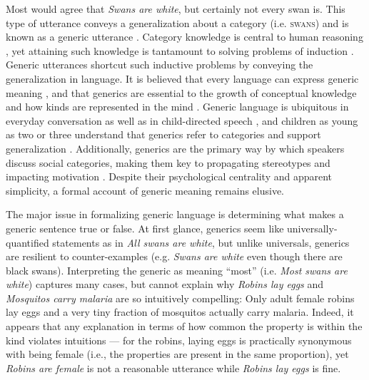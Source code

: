 \documentclass[12pt,letterpaper]{article}
\begin{document}
\newpage

Most would agree that \emph{Swans are white}, but certainly not every swan is.
This type of utterance conveys a generalization about a category (i.e. \textsc{swans}) and is known as a generic utterance \cite{Carlson1977,Leslie2008}.
Category knowledge is central to human reasoning \cite{Markman1989}, yet attaining such knowledge is tantamount to solving problems of induction \cite{Hume1888}. 
Generic utterances shortcut such inductive problems by conveying the generalization in language.
It is believed that every language can express generic meaning \cite{Behrens2005,Carlson1995}, and that generics are essential to the growth of conceptual knowledge \cite{Gelman2004} and how kinds are represented in the mind \cite{Leslie2008}.
Generic language is ubiquitous in everyday conversation as well as in child-directed speech \cite{Gelman2008}, and children as young as two or three understand that generics refer to categories and support generalization \cite{Cimpian2008}.
Additionally, generics are the primary way by which speakers discuss social categories, making them key to propagating stereotypes \cite{GelmanEtAl2004,Rhodes2012,Leslie2015} and impacting motivation \cite{Cimpian2010motivation}.
Despite their psychological centrality and apparent simplicity, a formal account of generic meaning remains elusive.

The major issue in formalizing generic language is determining what makes a generic sentence true or false.
At first glance, generics seem like universally-quantified statements as in \emph{All swans are white}, but unlike universals, generics are resilient to counter-examples (e.g. \emph{Swans are white} even though there are black swans). 
Interpreting the generic as meaning ``most'' (i.e. \emph{Most swans are white}) captures many cases, but cannot explain why \emph{Robins lay eggs} and \emph{Mosquitos carry malaria} are so intuitively compelling: Only adult female robins lay eggs and a very tiny fraction of mosquitos actually carry malaria.
Indeed, it appears that any explanation in terms of how common the property is within the kind violates intuitions --- for the robins, laying eggs is practically synonymous with being female (i.e., the properties are present in the same proportion), yet \emph{Robins are female} is not a reasonable utterance while \emph{Robins lay eggs} is fine.
\end{document}
